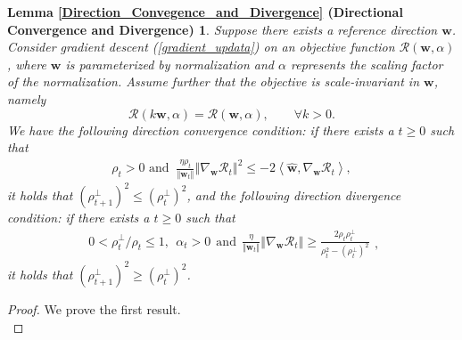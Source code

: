 \documentclass[pdflatex,sn-basic]{sn-jnl}%
\theoremstyle{thmstyleone}%
\begin{document}
\begin{appendices}
\newtheorem*{restate_Direction_Convegence_and_Divergence}{Lemma \ref{Direction_Convegence_and_Divergence} (Directional Convergence and Divergence)}
\begin{shaded}
  \begin{restate_Direction_Convegence_and_Divergence}
    Suppose there exists a reference direction $\hat{\mathbf{w}}$. 
  Consider gradient descent (\ref{gradient_updata}) on an objective function 
  $\mathcal{R} \left(\mathbf{w}, \alpha\right)$, where $\mathbf{w}$
  is parameterized by normalization and $\alpha$ represents the scaling factor of the normalization.
  Assume further that the objective is scale-invariant in $\mathbf{w}$, namely
  \[
    \mathcal{R}(k \mathbf{w}, \alpha) = \mathcal{R}(\mathbf{w}, \alpha),
    \qquad \forall k > 0.
  \]
  We have the following direction convergence condition: 
  if there exists a $t \ge 0$ such that 
  \begin{equation*}
  \begin{aligned}
  \rho_t > 0 \text{ and }\ 
    \frac{\eta {\rho}_{t}}{\Vert \mathbf{w}_{t} \Vert}
    \left\Vert
      \nabla_{\mathbf{w}} \mathcal{R}_t
    \right\Vert^2
    \le 
    - 2
    \left\langle 
      \hat{\mathbf{w}},
      \nabla_{\mathbf{w}} \mathcal{R}_t
    \right\rangle,
  \end{aligned}
  \end{equation*}
  it holds that $\left( {\rho}_{t+1}^{\perp} \right)^2 \le \left( {\rho}_{t}^{\perp}\right)^2$, 
  and the following direction divergence condition: 
  if there exists a $t \ge 0$ such that 
  \begin{equation*}
  \begin{aligned}
  0 < \rho_t^{\perp} / \rho_t \le 1, \ \ \alpha_t > 0
  \ \ \text{and} \ \ 
    \frac{\eta }{\Vert \mathbf{w}_t \Vert} 
    \left\Vert 
      \nabla_{\mathbf{w}} \mathcal{R}_t
    \right\Vert
    \ge
    \frac{2  {\rho}_t {\rho}_t^{\perp}}{
      {\rho}_t^2 
      - \left({\rho}_t^{\perp}\right)^2
    }
  \end{aligned},
  \end{equation*}
  it holds that $\left({\rho}_{t+1}^{\perp}\right)^2 \ge \left({\rho}_{t}^{\perp}\right)^2$. 
  \end{restate_Direction_Convegence_and_Divergence}
\end{shaded}
\begin{proof}
  We prove the first result. 
  \begin{equation*}

\end{equation*}
\end{proof}
\end{appendices}
\end{document}
